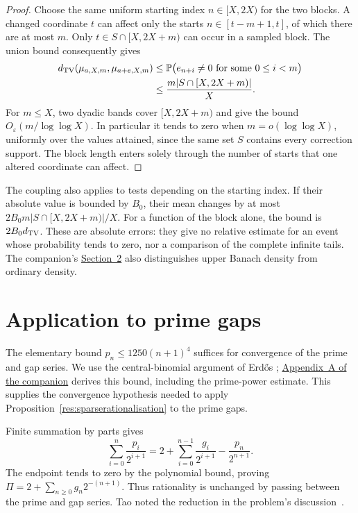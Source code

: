 \documentclass[11pt]{article}
\begin{document}
\begin{proof}
Choose the same uniform starting index $n\in[X,2X)$ for the two blocks.
A changed coordinate $t$ can affect only the starts
$n\in[t-m+1,t]$, of which there are at most $m$.
Only $t\in S\cap[X,2X+m)$ can occur in a sampled block.  The union
bound consequently gives
\[
 \begin{aligned}
 d_{\rm TV}(\mu_{a,X,m},\mu_{a+e,X,m})
 &\le\mathbb P\bigl(e_{n+i}\ne0\text{ for some }0\le i<m\bigr)\\
 &\le\frac{m|S\cap[X,2X+m)|}{X}.
 \end{aligned}
\]
For $m\le X$, two dyadic bands cover $[X,2X+m)$ and give the bound
$O_\varepsilon(m/\log\log X)$.  In particular it tends to zero when
$m=o(\log\log X)$, uniformly over the values attained, since the same set $S$ contains
every correction support.  The block length enters solely through
the number of starts that one altered coordinate can affect.

\end{proof}

The coupling also applies to tests depending on the starting index.
If their absolute value is bounded by $B_0$, their mean changes by at most
$2B_0m|S\cap[X,2X+m)|/X$.  For a function of the block alone, the bound is
$2B_0d_{\rm TV}$.  These are absolute errors: they give no relative
estimate for an event whose probability tends to zero, nor a comparison
of the complete infinite tails.  The companion's
\href{erdos251-prime-gap-reasoning-surface.pdf\#sparse-construction}{Section~2}
also distinguishes upper Banach density from ordinary density.

\section{Application to prime gaps}\label{sec:prime-application}
The elementary bound $p_n\le1250(n+1)^4$ suffices for convergence of
the prime and gap series.  We use the central-binomial argument of
Erd\H{o}s \cite[pp.~194--196]{erdos1932};
\href{erdos251-prime-gap-reasoning-surface.pdf\#prime-bound}{Appendix~A of the companion}
derives this bound, including the prime-power estimate.  This supplies
the convergence hypothesis needed to apply
Proposition~\ref{res:sparserationalisation} to the prime gaps.

Finite summation by parts gives
\[
 \sum_{i=0}^{n}\frac{p_i}{2^{i+1}}
 =2+\sum_{i=0}^{n-1}\frac{g_i}{2^{i+1}}-\frac{p_n}{2^{n+1}}.
\]
The endpoint tends to zero by the polynomial bound, proving
$\Pi=2+\sum_{n\ge0}g_n2^{-(n+1)}$. Thus rationality is unchanged by
passing between the prime and gap series. Tao noted the reduction in
the problem's discussion~\cite[7 October 2025]{erdosproblems251thread}.
\end{document}
